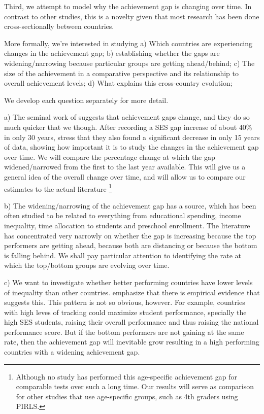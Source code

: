 \documentclass[11pt, a4paper]{article}\usepackage[]{graphicx}\usepackage[]{color}
\begin{document}
Third, we attempt to model why the achievement gap is changing over time. In contrast to other studies, this is a novelty given that most research has been done cross-sectionally between countries.

More formally, we're interested in studying
a) Which countries are experiencing changes in the achievement gap;
b) establishing whether the gaps are widening/narrowing because particular groups are getting ahead/behind;
c) The size of the achievement in a comparative perspective and its relationship to overall achievement levels;
d) What explains this cross-country evolution;

We develop each question separately for more detail.

a) The seminal work of \citet{reardon2011} suggests that achievement gaps change, and they do so much quicker that we though. After recording a SES gap increase of about 40\% in only 30 years, \citet{reardon_portilla} stress that they also found a significant decrease in only 15 years of data, showing how important it is to study the changes in the achievement gap over time. We will compare the percentage change at which the gap widened/narrowed from the first to the last year available. This will give us a general idea of the overall change over time, and will allow us to compare our estimates to the actual literature \footnote{Although no study has performed this age-specific achievement gap for comparable tests over such a long time. Our results will serve as comparison for other studies that use age-specific groups, such as 4th graders using PIRLS.}

b) The widening/narrowing of the achievement gap has a source, which has been often studied to be related to everything from educational spending, income inequality, time allocation to students and preschool enrollment. The literature has concentrated very narrowly on whether the gap is increasing because the top performers are getting ahead, because both are distancing or because the bottom is falling behind. We shall pay particular attention to identifying the rate at which the top/bottom groups are evolving over time.

c) We want to investigate whether better performing countries have lower levels of inequality than other countries. \citet{werfhorst_mijs} emphasize that there is empirical evidence that suggests this. This pattern is not so obvious, however. For example, countries with high leves of tracking could maximize student performance, specially the high SES students, raising their overall performance and thus raising the national performance score. But if the bottom performers are not gaining at the same rate, then the achievement gap will inevitable grow resulting in a high performing countries with a widening achievement gap.
\end{document}
